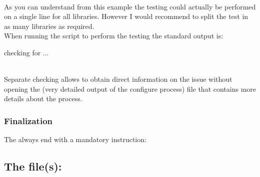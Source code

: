 \\[-0.25cm]
\noindent As you can understand from this example the testing could actually be performed on a single line for all libraries. 
However I would recommend to split the test in as many libraries as required. \\[0.25cm]
When running the  script to perform the testing the standard output is:
{\footnotesize{
\begin{script}
checking for ... 
\end{script}
}}
\\[-0.5cm]
\noindent Separate checking allows to obtain direct information on the issue without opening the  (very detailed output of the configure process) 
file that contains more details about the process. 

\subsubsection{Finalization}
\label{cfinal}

The  always end with a mandatory  instruction:
{\footnotesize{
\begin{script}


\end{script}
}}

\clearpage
\vspace{-1cm}
\subsection{The file(s): }

